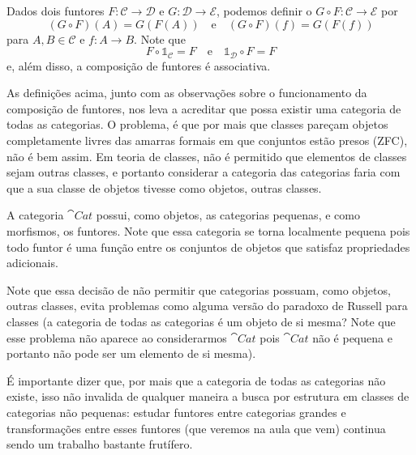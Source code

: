\begin{definicao}
    Dados dois funtores $F \colon \mathcal{C} \to \mathcal{D}$ e $G \colon \mathcal{D} \to \mathcal{E}$, podemos definir o  $G \circ F \colon \mathcal{C} \to \mathcal{E}$ por \begin{equation}
        (G \circ F)(A) = G(F(A)) \quad \text{e} \quad (G \circ F)(f) = G(F(f))
    \end{equation} para $A, B \in \mathcal{C}$ e $f \colon A \to B$. Note que \begin{equation}
        F \circ \mathbb{1}_{\mathcal{C}} = F \quad \text{e} \quad \mathbb{1}_\mathcal{D} \circ F = F
    \end{equation} e, além disso, a composição de funtores é associativa.
\end{definicao}

As definições acima, junto com as observações sobre o funcionamento da composição de funtores, nos leva a acreditar que possa existir uma categoria de todas as categorias. O problema, é que por mais que classes pareçam objetos completamente livres das amarras formais em que conjuntos estão presos (ZFC), não é bem assim. Em teoria de classes, não é permitido que elementos de classes sejam outras classes, e portanto considerar a categoria das categorias faria com que a sua classe de objetos tivesse como objetos, outras classes.

\begin{exemplo}
    A categoria $\cat{Cat}$ possui, como objetos, as categorias pequenas, e como morfismos, os funtores. Note que essa categoria se torna localmente pequena pois todo funtor é uma função entre os conjuntos de objetos que satisfaz propriedades adicionais.
\end{exemplo}

Note que essa decisão de não permitir que categorias possuam, como objetos, outras classes, evita problemas como alguma versão do paradoxo de Russell para classes (a categoria de todas as categorias é um objeto de si mesma? Note que esse problema não aparece ao considerarmos $\cat{Cat}$ pois $\cat{Cat}$ não é pequena e portanto não pode ser um elemento de si mesma).

É importante dizer que, por mais que a categoria de todas as categorias não existe, isso não invalida de qualquer maneira a busca por estrutura em classes de categorias não pequenas: estudar funtores entre categorias grandes e transformações entre esses funtores (que veremos na aula que vem) continua sendo um trabalho bastante frutífero.

